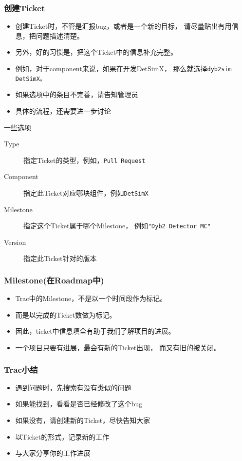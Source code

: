 \begin{frame}
    \frametitle{创建Ticket}
    \begin{itemize}    
        \item 创建Ticket时，不管是汇报bug，或者是一个新的目标，
              请尽量贴出有用信息，把问题描述清楚。
        \item 另外，好的习惯是，把这个Ticket中的信息补充完整。
        \item 例如，对于component来说，如果在开发DetSimX，
              那么就选择\tt{dyb2sim DetSimX}。
        \item 如果选项中的条目不完善，请告知管理员
        \item 具体的流程，还需要进一步讨论
    \end{itemize}
    \begin{block}{一些选项}
        \begin{description}
            \item[Type] 指定Ticket的类型，例如，{\tt Pull Request}
            \item[Component] 指定此Ticket对应哪块组件，例如{\tt DetSimX}
            \item[Milestone] 指定这个Ticket属于哪个Milestone，
                             例如{\tt "Dyb2 Detector MC"}
            \item[Version] 指定此Ticket针对的版本
        \end{description}
    \end{block}
\end{frame}

\begin{frame}
    \frametitle{Milestone(在Roadmap中)}
    \begin{itemize}    
        \item Trac中的Milestone，不是以一个时间段作为标记。
        \item 而是以完成的Ticket数做为标记。
        \item 因此，ticket中信息填全有助于我们了解项目的进展。
        \item 一个项目只要有进展，最会有新的Ticket出现，
              而又有旧的被关闭。
    \end{itemize}
\end{frame}

\begin{frame}
    \frametitle{Trac小结}
    \begin{itemize}    
        \item 遇到问题时，先搜索有没有类似的问题
        \item 如果能找到，看看是否已经修改了这个bug
        \item 如果没有，请创建新的Ticket，尽快告知大家
        \item 以Ticket的形式，记录新的工作
        \item 与大家分享你的工作进展
    \end{itemize}
\end{frame}
